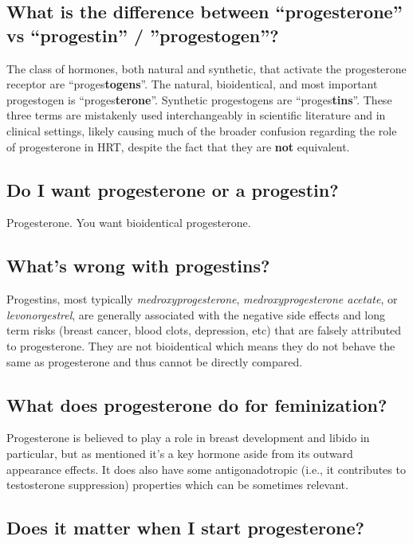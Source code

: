 \documentclass{article}
\begin{document}
\subsection{What is the difference between “progesterone” vs “progestin” / ”progestogen”?}

The class of hormones, both natural and synthetic, that activate the progesterone receptor are “proges\textbf{togens}”. The natural, bioidentical, and most important progestogen is “proges\textbf{terone}”. Synthetic progestogens are “proges\textbf{tins}”. These three terms are mistakenly used interchangeably in scientific literature and in clinical settings, likely causing much of the broader confusion regarding the role of progesterone in HRT, despite the fact that they are \textbf{not }equivalent.

\subsection{Do I want progesterone or a progestin?}

Progesterone. You want bioidentical progesterone.

\subsection{What’s wrong with progestins?}

Progestins, most typically \textit{medroxyprogesterone}, \textit{medroxyprogesterone acetate}, or \textit{levonorgestrel}, are generally associated with the negative side effects and long term risks (breast cancer, blood clots, depression, etc) that are falsely attributed to progesterone. They are not bioidentical which means they do not behave the same as progesterone and thus cannot be directly compared.

\subsection{What does progesterone do for feminization?}

Progesterone is believed to play a role in breast development and libido in particular, but as mentioned it’s a key hormone aside from its outward appearance effects. It does also have some antigonadotropic (i.e., it contributes to testosterone suppression) properties which can be sometimes relevant.

\subsection{Does it matter when I start progesterone?}
\end{document}
